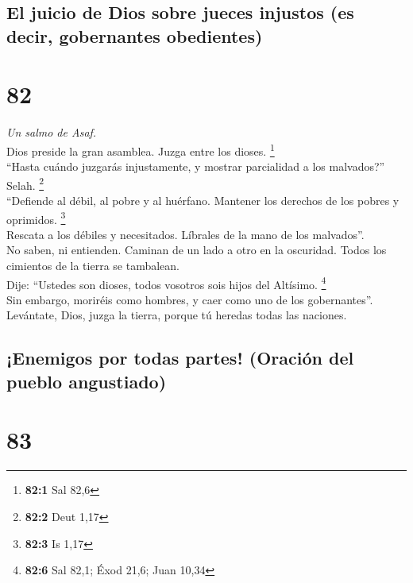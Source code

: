 \hypertarget{el-juicio-de-dios-sobre-jueces-injustos-es-decir-gobernantes-obedientes}{%
\subsection{El juicio de Dios sobre jueces injustos (es decir,
gobernantes
obedientes)}\label{el-juicio-de-dios-sobre-jueces-injustos-es-decir-gobernantes-obedientes}}

\hypertarget{section-79}{%
\section{82}\label{section-79}}

\emph{Un salmo de Asaf.}\\
 Dios preside la gran asamblea. Juzga entre los dioses.
\footnote{\textbf{82:1} Sal 82,6}\\
 ``Hasta cuándo juzgarás injustamente, y mostrar
parcialidad a los malvados?'' Selah. \footnote{\textbf{82:2} Deut 1,17}\\
 ``Defiende al débil, al pobre y al huérfano. Mantener los
derechos de los pobres y oprimidos. \footnote{\textbf{82:3} Is 1,17}\\
 Rescata a los débiles y necesitados. Líbrales de la mano
de los malvados''.\\
 No saben, ni entienden. Caminan de un lado a otro en la
oscuridad. Todos los cimientos de la tierra se tambalean.\\
 Dije: ``Ustedes son dioses, todos vosotros sois hijos del
Altísimo. \footnote{\textbf{82:6} Sal 82,1; Éxod 21,6; Juan 10,34}\\
 Sin embargo, moriréis como hombres, y caer como uno de
los gobernantes''.\\
 Levántate, Dios, juzga la tierra, porque tú heredas todas
las naciones.

\hypertarget{enemigos-por-todas-partes-oraciuxf3n-del-pueblo-angustiado}{%
\subsection{¡Enemigos por todas partes! (Oración del pueblo
angustiado)}\label{enemigos-por-todas-partes-oraciuxf3n-del-pueblo-angustiado}}

\hypertarget{section-80}{%
\section{83}\label{section-80}}

